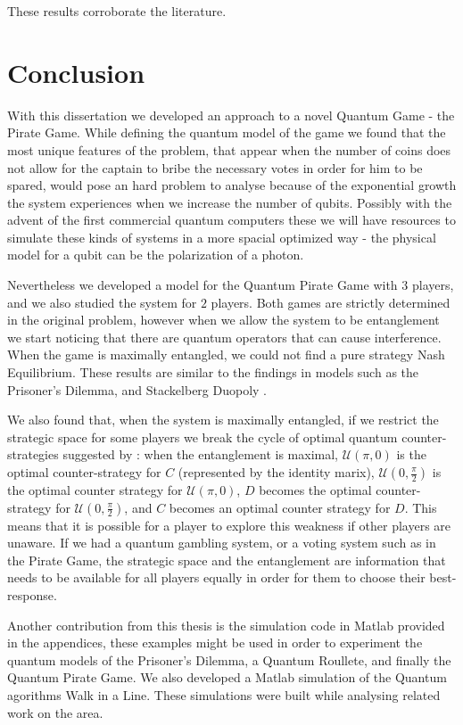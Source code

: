 \documentclass[10pt,twocolumn]{llncs}
\begin{document}
These results corroborate the literature.

\section{Conclusion}

With this dissertation we developed an approach to a novel Quantum Game - the Pirate Game. While defining the quantum model of the game we found that the most unique features of the problem, that appear when the number of coins does not allow for the captain to bribe the necessary votes in order for him to be spared, would pose an hard problem to analyse because of the exponential growth the system experiences when we increase the number of qubits. Possibly with the advent of the first commercial quantum computers these we will have resources to simulate these kinds of systems in a more spacial optimized way - the physical model for a qubit can be the polarization of a photon. 

Nevertheless we developed a model for the Quantum Pirate Game with $3$ players, and we also studied the system for $2$ players. Both games are strictly determined in the original problem, however when we allow the system to be entanglement we start noticing that  there are quantum operators that can cause interference. When the game is maximally entangled, we could not find a pure strategy Nash Equilibrium. These results are similar to the findings in models such as the Prisoner's Dilemma\cite{Eisert2008}\cite{Letters2002}, and Stackelberg Duopoly \cite{Khan2011}.

We also found that, when the system is maximally entangled, if we restrict the strategic space for some players we break the cycle of optimal quantum counter-strategies suggested by \cite{Du}: when the entanglement is maximal, $\mathcal{U}(\pi, 0)$ is the optimal counter-strategy for $C$ (represented by the identity marix), $\mathcal{U}(0, \frac{\pi}{2})$ is the optimal counter strategy for $\mathcal{U}(\pi, 0)$, $D$ becomes the optimal counter-strategy for $\mathcal{U}(0, \frac{\pi}{2})$, and $C$ becomes an optimal counter strategy for $D$. This means that it is possible for a player to explore this weakness if other players are unaware. If we had a quantum gambling system, or a voting system such as in the Pirate Game, the strategic space and the entanglement are information that needs to be available for all players equally in order for them to choose their best-response.

Another contribution from this thesis is the simulation code in Matlab provided in the appendices, these examples might be used in order to experiment the quantum models of the Prisoner's Dilemma, a Quantum Roullete, and finally the Quantum Pirate Game. We also developed a Matlab simulation of the Quantum agorithms Walk in a Line. These simulations were built while analysing related work on the area.
\end{document}
